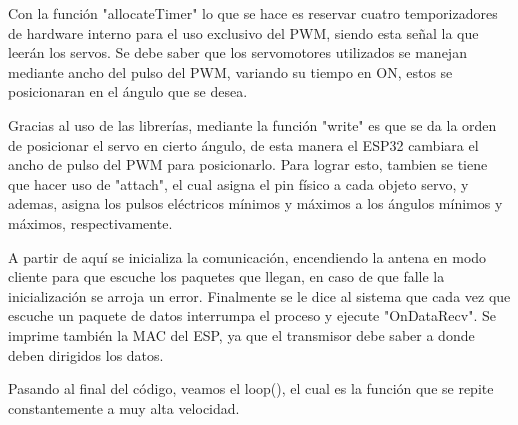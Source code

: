 \documentclass[10pt]{article}
\begin{document}
Con la función "allocateTimer" lo que se hace es reservar cuatro temporizadores de hardware interno para el uso exclusivo del PWM, siendo esta señal la que leerán los servos. Se debe saber que los servomotores utilizados se manejan mediante ancho del pulso del PWM, variando su tiempo en ON, estos se posicionaran en el ángulo que se desea.

Gracias al uso de las librerías, mediante la función "write" es que se da la orden de posicionar el servo en cierto ángulo, de esta manera el ESP32 cambiara el ancho de pulso del PWM para posicionarlo. Para lograr esto, tambien se tiene que hacer uso de "attach", el cual asigna el pin físico a cada objeto servo, y ademas, asigna los pulsos eléctricos mínimos y máximos a los ángulos mínimos y máximos, respectivamente. 

A partir de aquí se inicializa la comunicación, encendiendo la antena en modo cliente para que escuche los paquetes que llegan, en caso de que falle la inicialización se arroja un error. Finalmente se le dice al sistema que cada vez que escuche un paquete de datos interrumpa el proceso y ejecute "OnDataRecv". Se imprime también la MAC del ESP, ya que el transmisor debe saber a donde deben dirigidos los datos.  

Pasando al final del código, veamos el loop(), el cual es la función que se repite constantemente a muy alta velocidad. 
\end{document}
